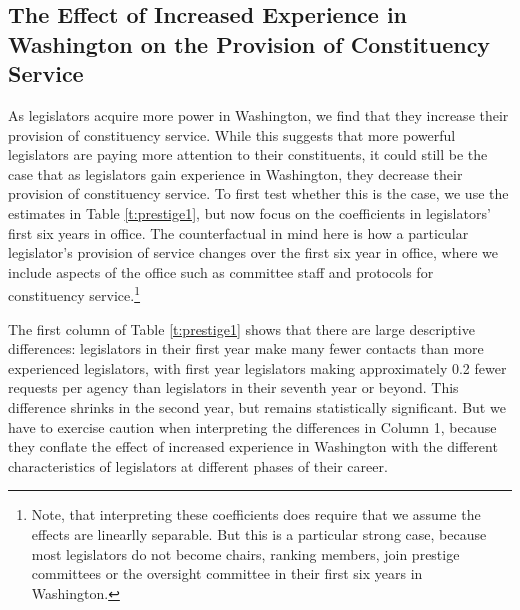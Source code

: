 \documentclass{article}
\begin{document}
\subsection{The Effect of Increased Experience in Washington on the Provision of Constituency Service}\label{s:tenure}

As legislators acquire more power in Washington, we find that they increase their provision of constituency service.  While this suggests that more powerful legislators are paying more attention to their constituents, it could still be the case that as legislators gain experience in Washington, they decrease their provision of constituency service.  To first test whether this is the case, we use the estimates in Table \ref{t:prestige1}, but now focus on the coefficients in legislators' first six years in office.  The counterfactual in mind here is how a particular legislator's provision of service changes over the first six year in office, where we include aspects of the office such as committee staff and protocols for constituency service.\footnote{Note, that interpreting these coefficients does require that we assume the effects are linearlly separable.  But this is a particular strong case, because most legislators do not become chairs, ranking members, join prestige committees or the oversight committee in their first six years in Washington. } 


The first column of Table \ref{t:prestige1} shows that there are large descriptive differences: legislators in their first year make many fewer contacts than more experienced legislators, with first year legislators making approximately 0.2 fewer requests per agency than legislators in their seventh year or beyond.  This difference shrinks in the second year, but remains statistically significant.  But we have to exercise caution when interpreting the differences in Column 1, because they conflate the effect of increased experience in Washington with the different characteristics of legislators at different phases of their career.    



\end{document}
